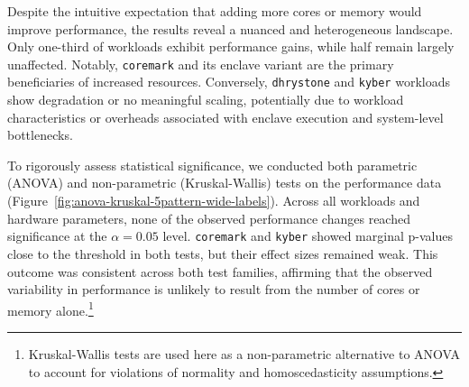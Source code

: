 Despite the intuitive expectation that adding more cores or memory would improve performance, the results reveal a nuanced and heterogeneous landscape. Only one-third of workloads exhibit performance gains, while half remain largely unaffected. Notably, \texttt{coremark} and its enclave variant are the primary beneficiaries of increased resources. Conversely, \texttt{dhrystone} and \texttt{kyber} workloads show degradation or no meaningful scaling, potentially due to workload characteristics or overheads associated with enclave execution and system-level bottlenecks.

To rigorously assess statistical significance, we conducted both parametric (ANOVA) and non-parametric (Kruskal-Wallis) tests on the performance data (Figure~\ref{fig:anova-kruskal-5pattern-wide-labels}). Across all workloads and hardware parameters, none of the observed performance changes reached significance at the $\alpha = 0.05$ level. \texttt{coremark} and \texttt{kyber} showed marginal p-values close to the threshold in both tests, but their effect sizes remained weak. This outcome was consistent across both test families, affirming that the observed variability in performance is unlikely to result from the number of cores or memory alone.\footnote{Kruskal-Wallis tests are used here as a non-parametric alternative to ANOVA to account for violations of normality and homoscedasticity assumptions.}


